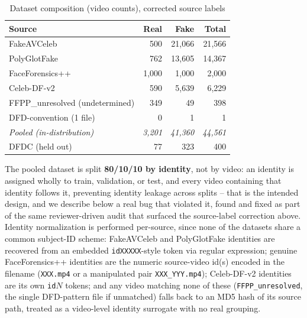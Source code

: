 \documentclass[conference]{IEEEtran}
\begin{document}
\begin{table}[t]
\caption{Dataset composition (video counts), corrected source labels}
\label{tab:dataset}
\centering
\begin{tabular}{@{}lrrr@{}}
\toprule
Source & Real & Fake & Total \\
\midrule
FakeAVCeleb \cite{khalid2021fakeavceleb} & 500 & 21{,}066 & 21{,}566 \\
PolyGlotFake \cite{polyglotfake2025} & 762 & 13{,}605 & 14{,}367 \\
FaceForensics++ \cite{rossler2019faceforensics} & 1{,}000 & 1{,}000 & 2{,}000 \\
Celeb-DF-v2 \cite{li2020celebdf} & 590 & 5{,}639 & 6{,}229 \\
FFPP\_unresolved (undetermined) & 349 & 49 & 398 \\
DFD-convention (1 file) & 0 & 1 & 1 \\
\midrule
\textit{Pooled (in-distribution)} & \textit{3{,}201} & \textit{41{,}360} & \textit{44{,}561} \\
\midrule
DFDC \cite{dolhansky2020dfdc} (held out) & 77 & 323 & 400 \\
\bottomrule
\end{tabular}
\end{table}

The pooled dataset is split \textbf{80/10/10 by identity}, not by video: an
identity is assigned wholly to train, validation, or test, and every video
containing that identity follows it, preventing identity leakage across
splits -- that is the intended design, and we describe below a real bug
that violated it, found and fixed as part of the same reviewer-driven audit
that surfaced the source-label correction above. Identity normalization is
performed per-source, since none of the datasets share a common subject-ID
scheme: FakeAVCeleb and PolyGlotFake identities are recovered from an
embedded \texttt{idXXXXX}-style token via regular expression; genuine
FaceForensics++ identities are the numeric source-video id(s) encoded in the
filename (\texttt{XXX.mp4} or a manipulated pair \texttt{XXX\_YYY.mp4});
Celeb-DF-v2 identities are its own \texttt{id}$N$ tokens; and any video
matching none of these (\texttt{FFPP\_unresolved}, the single DFD-pattern
file if unmatched) falls back to an MD5 hash of its source path, treated as
a video-level identity surrogate with no real grouping.
\end{document}
